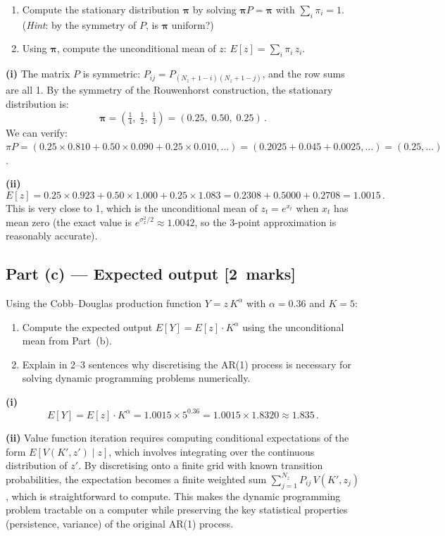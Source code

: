 \documentclass[11pt,a4paper]{article}
\newcommand{\mkpts}[1]{\hfill\textbf{[#1~marks]}}
\begin{document}
\begin{enumerate}[label=(\roman*),nosep]
\item Compute the stationary distribution $\boldsymbol{\pi}$ by solving $\boldsymbol{\pi}P = \boldsymbol{\pi}$ with $\sum_i \pi_i = 1$.  (\textit{Hint}: by the symmetry of $P$, is $\boldsymbol{\pi}$ uniform?)
\item Using $\boldsymbol{\pi}$, compute the unconditional mean of $z$: $E[z] = \sum_i \pi_i\,z_i$.
\end{enumerate}

\begin{solution}
\textbf{(i)} The matrix $P$ is symmetric: $P_{ij} = P_{(N_z+1-i)(N_z+1-j)}$, and the row sums are all 1.  By the symmetry of the Rouwenhorst construction, the stationary distribution is:
\[
\boxed{\boldsymbol{\pi} = \left(\tfrac{1}{4},\; \tfrac{1}{2},\; \tfrac{1}{4}\right) = (0.25,\; 0.50,\; 0.25)}\,.
\]
We can verify: $\pi P = (0.25\times 0.810 + 0.50\times 0.090 + 0.25\times 0.010, \ldots) = (0.2025 + 0.045 + 0.0025, \ldots) = (0.25, \ldots)$. \checkmark

\medskip

\textbf{(ii)}
\[
E[z] = 0.25 \times 0.923 + 0.50 \times 1.000 + 0.25 \times 1.083 = 0.2308 + 0.5000 + 0.2708 = \boxed{1.0015}\,.
\]
This is very close to 1, which is the unconditional mean of $z_t = e^{x_t}$ when $x_t$ has mean zero (the exact value is $e^{\sigma_x^2/2} \approx 1.0042$, so the 3-point approximation is reasonably accurate).
\end{solution}

\subsection*{Part (c) --- Expected output \mkpts{2}}

Using the Cobb--Douglas production function $Y = z\,K^\alpha$ with $\alpha = 0.36$ and $K = 5$:

\begin{enumerate}[label=(\roman*),nosep]
\item Compute the expected output $E[Y] = E[z]\cdot K^\alpha$ using the unconditional mean from Part~(b).
\item Explain in 2--3 sentences why discretising the AR(1) process is necessary for solving dynamic programming problems numerically.
\end{enumerate}

\begin{solution}
\textbf{(i)}
\[
E[Y] = E[z] \cdot K^\alpha = 1.0015 \times 5^{0.36} = 1.0015 \times 1.8320 \approx \boxed{1.835}\,.
\]

\textbf{(ii)} Value function iteration requires computing conditional expectations of the form $E[V(K',z') \mid z]$, which involves integrating over the continuous distribution of $z'$.  By discretising onto a finite grid with known transition probabilities, the expectation becomes a finite weighted sum $\sum_{j=1}^{N_z} P_{ij}\,V(K',z_j)$, which is straightforward to compute.  This makes the dynamic programming problem tractable on a computer while preserving the key statistical properties (persistence, variance) of the original AR(1) process.
\end{solution}
\end{document}
